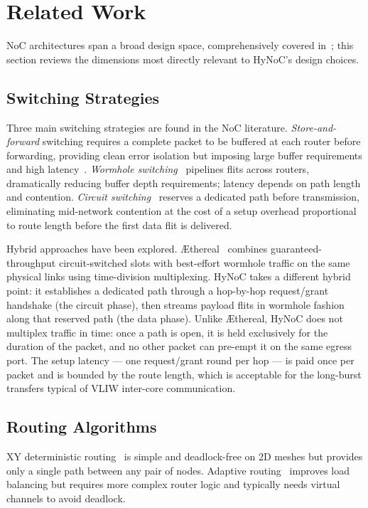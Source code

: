 \section{Related Work}
\label{sec:related}

NoC architectures span a broad design space, comprehensively covered
in~\cite{dally2004}; this section reviews the dimensions most directly relevant
to HyNoC's design choices.

\subsection{Switching Strategies}

Three main switching strategies are found in the NoC literature.
\emph{Store-and-forward} switching requires a complete packet to be buffered at
each router before forwarding, providing clean error isolation but imposing large
buffer requirements and high latency~\cite{dally2001}.
\emph{Wormhole switching}~\cite{dally1987} pipelines flits across routers,
dramatically reducing buffer depth requirements; latency depends on path length
and contention.
\emph{Circuit switching}~\cite{kumar2002} reserves a dedicated path before
transmission, eliminating mid-network contention at the cost of a setup overhead
proportional to route length before the first data flit is delivered.

Hybrid approaches have been explored. {\AE}thereal~\cite{goossens2005} combines
guaranteed-throughput circuit-switched slots with best-effort wormhole traffic on
the same physical links using time-division multiplexing. HyNoC takes a different
hybrid point: it establishes a dedicated path through a hop-by-hop request/grant
handshake (the circuit phase), then streams payload flits in wormhole fashion
along that reserved path (the data phase). Unlike {\AE}thereal, HyNoC does not
multiplex traffic in time: once a path is open, it is held exclusively for the
duration of the packet, and no other packet can pre-empt it on the same egress
port. The setup latency — one request/grant round per hop — is paid once per
packet and is bounded by the route length, which is acceptable for the long-burst
transfers typical of VLIW inter-core communication.

\subsection{Routing Algorithms}

XY deterministic routing~\cite{dally2001} is simple and deadlock-free on 2D
meshes but provides only a single path between any pair of nodes. Adaptive
routing~\cite{duato1993} improves load balancing but requires more complex router
logic and typically needs virtual channels to avoid deadlock.


